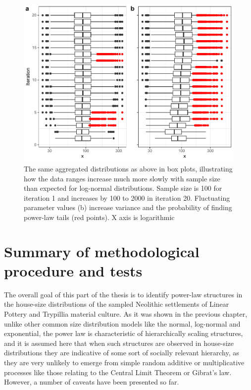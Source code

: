 \documentclass[
  12pt,
  a4paper, twoside]{book}
\begin{document}
\begin{figure}

{\centering \includegraphics[width=0.9\linewidth]{bookdown-demo_files/figure-latex/05-multi-ln-box-1} 

}

\caption[Aggregated log-normals and power-law tails, box plot]{The same aggregated distributions as above in box plots, illustrating how the data ranges increase much more slowly with sample size than expected for log-normal distributions. Sample size is 100 for iteration 1 and increases by 100 to 2000 in iteration 20. Fluctuating parameter values (b) increase variance and the probability of finding power-law tails (red points). X axis is logarithmic}\label{fig:05-multi-ln-box}
\end{figure}

\FloatBarrier

\hypertarget{summary-of-methodological-procedure-and-tests}{%
\section{Summary of methodological procedure and tests}\label{summary-of-methodological-procedure-and-tests}}

The overall goal of this part of the thesis is to identify power-law structures in the house-size distributions of the sampled Neolithic settlements of Linear Pottery and Trypillia material culture. As it was shown in the previous chapter, unlike other common size distribution models like the normal, log-normal and exponential, the power law is characteristic of hierarchically scaling structures, and it is assumed here that when such structures are observed in house-size distributions they are indicative of some sort of socially relevant hierarchy, as they are very unlikely to emerge from simple random additive or multiplicative processes like those relating to the Central Limit Theorem or Gibrat's law. However, a number of caveats have been presented so far.
\end{document}
